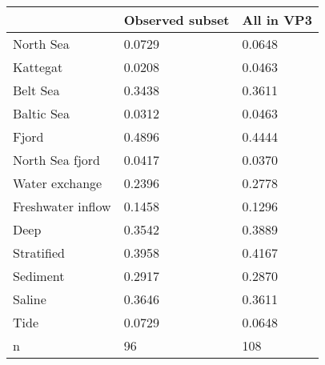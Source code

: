 \begin{tabular}{lll}
\toprule
 & Observed subset & All in VP3 \\
\midrule
North Sea & 0.0729 & 0.0648 \\
Kattegat & 0.0208 & 0.0463 \\
Belt Sea & 0.3438 & 0.3611 \\
Baltic Sea & 0.0312 & 0.0463 \\
Fjord & 0.4896 & 0.4444 \\
North Sea fjord & 0.0417 & 0.0370 \\
Water exchange & 0.2396 & 0.2778 \\
Freshwater inflow & 0.1458 & 0.1296 \\
Deep & 0.3542 & 0.3889 \\
Stratified & 0.3958 & 0.4167 \\
Sediment & 0.2917 & 0.2870 \\
Saline & 0.3646 & 0.3611 \\
Tide & 0.0729 & 0.0648 \\
n & 96 & 108 \\
\bottomrule
\end{tabular}
